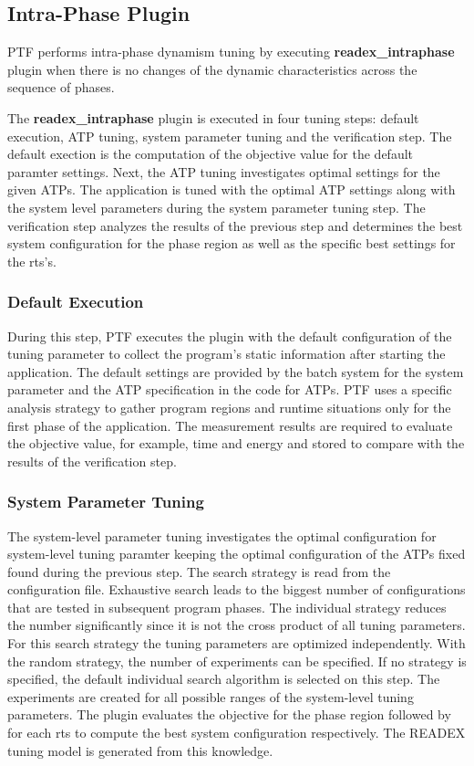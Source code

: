 \subsection{Intra-Phase Plugin} \label{sec:intra-phase}

PTF performs intra-phase dynamism tuning by executing \textbf{readex\_intraphase} plugin when there is no changes of the dynamic characteristics across the sequence of phases.  

The \textbf{readex\_intraphase} plugin is executed in four tuning steps: default execution, ATP tuning, system parameter tuning and the verification step. The default exection is the computation of the objective value for the default paramter settings. Next, the ATP tuning investigates optimal settings for the given ATPs. The application is tuned with the optimal ATP settings along with the system level parameters during the system parameter tuning step. The verification step analyzes the results of the previous step and determines the best system configuration for the phase region as well as the specific best settings for the rts's.

\subsubsection{Default Execution} \label{intra-default-execution} 

During this step, PTF executes the plugin with the default configuration of the tuning parameter to collect the program's static information after starting the application. The default settings are provided by the batch system for the system parameter and the ATP specification in the code for ATPs. PTF uses a specific analysis strategy to gather program regions and runtime situations only for the first phase of the application. The measurement results are required to evaluate the objective value, for example, time and energy and stored to compare with the results of the verification step.

\subsubsection{System Parameter Tuning} \label{sys-tuning} 

The system-level parameter tuning investigates the optimal configuration for system-level tuning paramter keeping the optimal configuration of the ATPs fixed found during the previous step. The search strategy is read from the configuration file. Exhaustive search leads to the biggest number of configurations that are tested in subsequent program phases. The individual strategy reduces the number significantly since it is not the cross product of all tuning parameters. For this search strategy the tuning parameters are optimized independently. With the random strategy, the number of experiments can be specified. If no strategy is specified, the default individual search algorithm is selected on this step. The experiments are created for all possible ranges of the system-level tuning parameters. The plugin evaluates the objective for the phase region followed by for each rts to compute the best system configuration respectively. The READEX tuning model is generated from this knowledge. 

